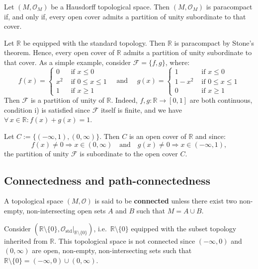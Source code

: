 \documentclass[root.tex]{subfiles}
\begin{document}
\begin{theorem}
Let $(M,\mathcal{O}_M)$ be a Hausdorff topological space. Then $(M,\mathcal{O}_M)$ is paracompact if, and only if, every open cover admits a partition of unity subordinate to that cover.
\end{theorem}

\begin{myex}
Let $\mathbb{R}$ be equipped with the standard topology. Then $\mathbb{R}$ is paracompact by Stone's theorem. Hence, every open cover of $\mathbb{R}$ admits a partition of unity subordinate to that cover. As a simple example, consider $\mathcal{F} = \{f,g\}$, where:
$$
f(x) = \left\{ \begin{aligned} 0 & \text{ if } x \leq 0\\ x^2 & \text{ if } 0\leq x\leq 1\\ 1 & \text{ if } x \geq 1 \end{aligned} \right.
\quad \text{and } \quad
g(x) = \left\{ \begin{aligned} 1 & \text{ if } x \leq 0\\ 1-x^2 & \text{ if } 0\leq x\leq 1\\ 0 & \text{ if } x \geq 1 \end{aligned} \right. 
$$
Then $\mathcal{F}$ is a partition of unity of $\mathbb{R}$. Indeed, $f,g: \mathbb{R} \to [0,1]$ are both continuous, condition i) is satisfied since $\mathcal{F}$ itself is finite, and we have $\forall \, x \in \mathbb{R} : f(x)+g(x)=1$.

Let $C:=\{(-\infty,1),(0,\infty)\}$. Then $C$ is an open cover of $\mathbb{R}$ and since:
$$
f(x)\neq 0 \Rightarrow x \in (0,\infty) \quad \text{and} \quad g(x) \neq 0 \Rightarrow x \in (-\infty,1),
$$
the partition of unity $\mathcal{F}$ is subordinate to the open cover $C$.
\end{myex}


\subsection{Connectedness and path-connectedness}

\begin{mydef}
A topological space $(M,\mathcal{O})$ is said to be \textbf{connected} unless there exist two non-empty, non-intersecting open sets $A$ and $B$ such that $M=A\cup B$.
\end{mydef}

\begin{myex}
  Consider $(\mathbb{R}\setminus \{0\},\mathcal{O}_\mathrm{std}|_{\mathbb{R}\setminus\{0\}})$, i.e.\ $\mathbb{R}\setminus\{0\}$ equipped with the subset topology inherited from $\mathbb{R}$. This topological space is not connected since $(-\infty,0)$ and $(0,\infty)$ are open, non-empty, non-intersecting sets such that $\mathbb{R}\setminus\{0\}=(-\infty,0) \cup (0,\infty)$.
\end{myex}
\end{document}
